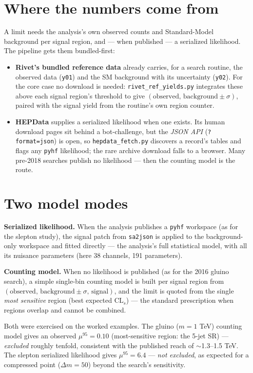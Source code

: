 \documentclass[11pt,oneside]{report}
\newcommand{\code}[1]{\texttt{#1}}
\begin{document}
\section{Where the numbers come from}
A limit needs the analysis's own observed counts and Standard-Model background per signal region, and
--- when published --- a serialized likelihood. The pipeline gets them bundled-first:
\begin{itemize}[nosep]
  \item \textbf{Rivet's bundled reference data} already carries, for a search routine, the observed
        data (\code{y01}) and the SM background with its uncertainty (\code{y02}). For the core case
        no download is needed: \code{rivet\_ref\_yields.py} integrates these above each signal
        region's threshold to give $(\text{observed},\,\text{background}\pm\sigma)$, paired with the
        signal yield from the routine's own region counter.
  \item \textbf{HEPData} supplies a serialized likelihood when one exists. Its human download pages
        sit behind a bot-challenge, but the \emph{JSON API} (\code{?format=json}) is open, so
        \code{hepdata\_fetch.py} discovers a record's tables and flags any \texttt{pyhf} likelihood;
        the rare archive download falls to a browser. Many pre-2018 searches publish no likelihood ---
        then the counting model is the route.
\end{itemize}

\section{Two model modes}
\textbf{Serialized likelihood.} When the analysis publishes a \texttt{pyhf} workspace (as for the
slepton study), the signal patch from \code{sa2json} is applied to the background-only workspace and
fitted directly --- the analysis's full statistical model, with all its nuisance parameters
(here 38 channels, 191 parameters).

\textbf{Counting model.} When no likelihood is published (as for the 2016 gluino search), a simple
single-bin counting model is built per signal region from $(\text{observed},\,\text{background}\pm
\sigma,\,\text{signal})$, and the limit is quoted from the single \emph{most sensitive} region (best
expected $\mathrm{CL}_s$) --- the standard prescription when regions overlap and cannot be combined.

Both were exercised on the worked examples. The gluino ($m=1$ TeV) counting model gives an observed
$\mu^{95}=0.10$ (most-sensitive region: the 5-jet SR) --- \emph{excluded} roughly tenfold, consistent
with the published reach of $\sim$1.3--1.5 TeV. The slepton serialized likelihood gives
$\mu^{95}=6.4$ --- \emph{not excluded}, as expected for a compressed point ($\Delta m=50$) beyond the
search's sensitivity.
\end{document}

